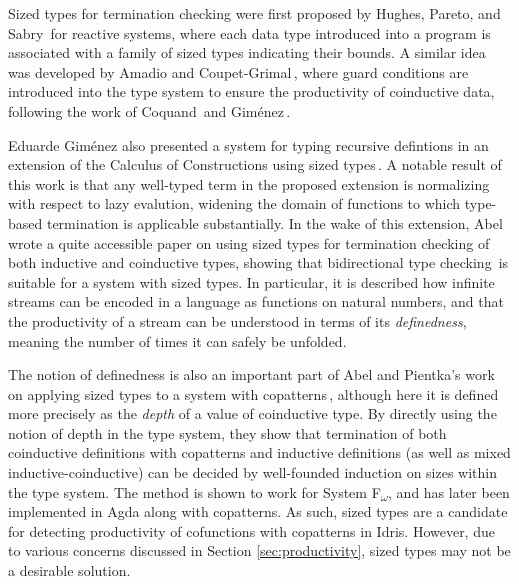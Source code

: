 Sized types for termination checking were first proposed by Hughes, Pareto, and Sabry\,\citep{Hughes96} for reactive systems, where each data type introduced into a program is associated with a family of sized types indicating their bounds. A similar idea was developed by Amadio and Coupet-Grimal\,\citep{Amadio98}, where guard conditions are introduced into the type system to ensure the productivity of coinductive data, following the work of Coquand\,\citep{Coquand94} and Gim\'{e}nez\,\citep{Gimenez95}.

Eduarde Gim\'{e}nez also presented a system for typing recursive defintions in an extension of the Calculus of Constructions using sized types\,\citep{Gimenez98structuralrecursive}. A notable result of this work is that any well-typed term in the proposed extension is normalizing with respect to lazy evalution, widening the domain of functions to which type-based termination is applicable substantially. In the wake of this extension, Abel\,\citep{Abel99terminationchecking} wrote a quite accessible paper on using sized types for termination checking of both inductive and coinductive types, showing that bidirectional type checking\,\citep{Pierce00} is suitable for a system with sized types. In particular, it is described how infinite streams can be encoded in a language as functions on natural numbers, and that the productivity of a stream can be understood in terms of its \emph{definedness}, meaning the number of times it can safely be unfolded.

The notion of definedness is also an important part of Abel and Pientka's work on applying sized types to a system with copatterns\,\citep{Abel13Wellfounded}, although here it is defined more precisely as the \emph{depth} of a value of coinductive type. By directly using the notion of depth in the type system, they show that termination of both coinductive definitions with copatterns and inductive definitions (as well as mixed inductive-coinductive) can be decided by well-founded induction on sizes within the type system. The method is shown to work for System F\textsubscript{$\omega$}, and has later been implemented in Agda along with copatterns. As such, sized types are a candidate for detecting productivity of cofunctions with copatterns in Idris. However, due to various concerns discussed in Section \ref{sec:productivity}, sized types may not be a desirable solution.

